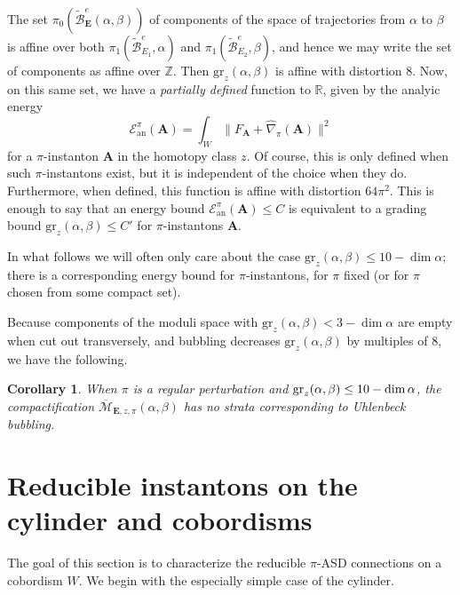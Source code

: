 \documentclass[10pt,a4paper]{amsart}
\newtheorem{corollary}[theorem]{Corollary}
\theoremstyle{definition}
\theoremstyle{remark}
\numberwithin{figure}{qchap}
\begin{document}
The set $\pi_0\left(\widetilde{\mathcal B}^e_{\mathbf{E}}(\alpha, \beta)\right)$ of components of the space of trajectories from $\alpha$ to $\beta$ is affine over both $\pi_1(\widetilde{\mathcal B}^e_{E_1}, \alpha)$ and $\pi_1(\widetilde{\mathcal B}^e_{E_2},\beta)$, and hence we may write the set of components as affine over $\mathbb Z$. Then $\text{gr}_z(\alpha, \beta)$ is affine with distortion $8$. Now, on this same set, we have a \emph{partially defined} function to $\mathbb R$, given by the analyic energy
$$\mathcal E^\pi_{\text{an}}(\mathbf{A}) = \int_W \|F_{\mathbf{A}} + \widehat{\nabla}_\pi(\mathbf{A})\|^2$$
for a $\pi$-instanton $\mathbf{A}$ in the homotopy class $z$. Of course, this is only defined when such $\pi$-instantons exist, but it is independent of the choice when they do. Furthermore, when defined, this function is affine with distortion $64\pi^2$. This is enough to say that an energy bound $\mathcal E^\pi_{\text{an}}(\mathbf{A}) \leq C$ is equivalent to a grading bound $\text{gr}_z(\alpha, \beta) \leq C'$ for $\pi$-instantons $\mathbf{A}$.

In what follows we will often only care about the case $\text{gr}_z(\alpha, \beta) \leq 10 - \dim \alpha$; there is a corresponding energy bound for $\pi$-instantons, for $\pi$ fixed (or for $\pi$ chosen from some compact set).

Because components of the moduli space with $\text{gr}_z(\alpha, \beta) < 3 - \dim \alpha$ are empty when cut out transversely, and bubbling decreases $\text{gr}_z(\alpha,\beta)$ by multiples of $8$, we have the following.

\begin{corollary}\label{nobubbling}When $\pi$ is a regular perturbation and $\textup{gr}_z(\alpha, \beta) \leq 10 - \dim \alpha$, the compactification $\overline{\mathcal M}_{\mathbf{E},z,\pi}(\alpha,\beta)$ has no strata corresponding to Uhlenbeck bubbling.
\end{corollary}

\section{Reducible instantons on the cylinder and cobordisms}\label{sec:4d-red}
The goal of this section is to characterize the reducible $\pi$-ASD connections on a cobordism $W$. We begin with the especially simple case of the cylinder.
\end{document}
